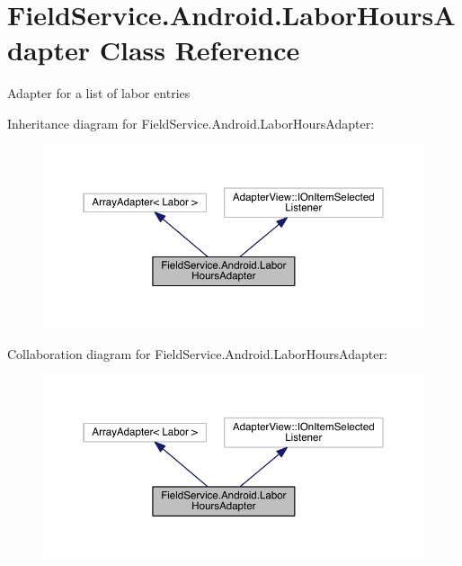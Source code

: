 \hypertarget{class_field_service_1_1_android_1_1_labor_hours_adapter}{\section{Field\+Service.\+Android.\+Labor\+Hours\+Adapter Class Reference}
\label{class_field_service_1_1_android_1_1_labor_hours_adapter}
}


Adapter for a list of labor entries  




Inheritance diagram for Field\+Service.\+Android.\+Labor\+Hours\+Adapter\+:
\nopagebreak
\begin{figure}[H]
\begin{center}
\leavevmode
\includegraphics[width=350pt]{class_field_service_1_1_android_1_1_labor_hours_adapter__inherit__graph}
\end{center}
\end{figure}


Collaboration diagram for Field\+Service.\+Android.\+Labor\+Hours\+Adapter\+:
\nopagebreak
\begin{figure}[H]
\begin{center}
\leavevmode
\includegraphics[width=350pt]{class_field_service_1_1_android_1_1_labor_hours_adapter__coll__graph}
\end{center}
\end{figure}
